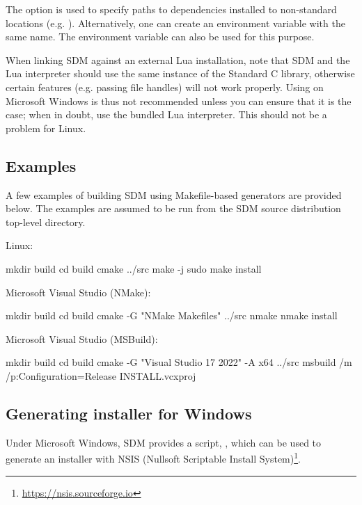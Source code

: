 \documentclass[a4paper,12pt,twoside,extrafontsizes]{memoir}
\begin{document}
The  option is used to specify paths to dependencies installed to non-standard locations (e.g. ). Alternatively, one can create an environment variable with the same name. The  environment variable can also be used for this purpose.

When linking SDM against an external Lua installation, note that SDM and the Lua interpreter should use the same instance of the Standard C library, otherwise certain features (e.g. passing file handles) will not work properly. Using  on Microsoft Windows is thus not recommended unless you can ensure that it is the case; when in doubt, use the bundled Lua interpreter. This should not be a problem for Linux.

\subsection{Examples}

A few examples of building SDM using Makefile-based generators are provided below. The examples are assumed to be run from the SDM source distribution top-level directory.

Linux:

\begin{shellcmds}
mkdir build
cd build
cmake ../src
make -j
sudo make install
\end{shellcmds}

Microsoft Visual Studio (NMake):

\begin{shellcmds}
mkdir build
cd build
cmake -G "NMake Makefiles" ../src
nmake
nmake install
\end{shellcmds}

Microsoft Visual Studio (MSBuild):

\begin{shellcmds}
mkdir build
cd build
cmake -G "Visual Studio 17 2022" -A x64 ../src
msbuild /m /p:Configuration=Release INSTALL.vcxproj
\end{shellcmds}

\subsection{Generating installer for Windows}
\label{subsec:wininstaller}

Under Microsoft Windows, SDM provides a script, , which can be used to generate an installer with NSIS (Nullsoft Scriptable Install System)\footnote{\url{https://nsis.sourceforge.io}}.
\end{document}
